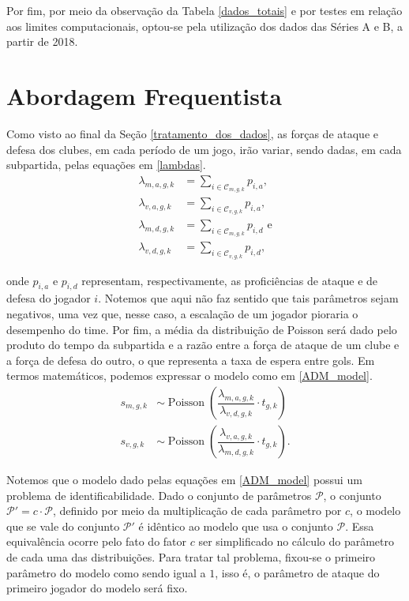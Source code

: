 Por fim, por meio da observação da Tabela \ref{dados_totais} e por testes em relação aos limites computacionais, optou-se pela utilização dos dados das Séries A e B, a partir de 2018.

\section{Abordagem Frequentista}
\label{abordagem_frequentista}

Como visto ao final da Seção \ref{tratamento_dos_dados}, as forças de ataque e defesa dos clubes, em cada período de um jogo, irão variar, sendo dadas, em cada subpartida, pelas equações em \ref{lambdas}.
\begin{equation}
    \begin{split}
        \lambda_{m, a, g, k} & = \sum_{i \in \mathcal{C}_{m, g, k}} p_{i, a}, \\
        \lambda_{v, a, g, k} & = \sum_{i \in \mathcal{C}_{v, g, k}} p_{i, a}, \\
        \lambda_{m, d, g, k} & = \sum_{i \in \mathcal{C}_{m, g, k}} p_{i, d} \text{ e} \\
        \lambda_{v, d, g, k} & = \sum_{i \in \mathcal{C}_{v, g, k}} p_{i, d},
    \end{split}
    \label{lambdas}
\end{equation}

\noindent onde $p_{i, a}$ e $p_{i, d}$ representam, respectivamente, as proficiências de ataque e de defesa do jogador $i$. Notemos que aqui não faz sentido que tais parâmetros sejam negativos, uma vez que, nesse caso, a escalação de um jogador pioraria o desempenho do time. Por fim, a média da distribuição de Poisson será dado pelo produto do tempo da subpartida e a razão entre a força de ataque de um clube e a força de defesa do outro, o que representa a taxa de espera entre gols. Em termos matemáticos, podemos expressar o modelo como em \ref{ADM_model}.
\begin{equation}
    \begin{split}
    s_{m, g, k} & \sim \operatorname{Poisson}\left(\dfrac{\lambda_{m,a,g,k}}{\lambda_{v,d,g,k}} \cdot t_{g,k}\right) \\
    s_{v, g, k} & \sim \operatorname{Poisson}\left(\dfrac{\lambda_{v,a,g,k}}{\lambda_{m,d,g,k}} \cdot t_{g,k}\right).
    \end{split}
    \label{ADM_model}
\end{equation}

Notemos que o modelo dado pelas equações em \ref{ADM_model} possui um problema de identificabilidade. Dado o conjunto de parâmetros $\mathcal{P}$, o conjunto $\mathcal{P}' = c\cdot \mathcal{P}$, definido por meio da multiplicação de cada parâmetro por $c$, o modelo que se vale do conjunto $\mathcal{P}'$ é idêntico ao modelo que usa o conjunto $\mathcal{P}$. Essa equivalência ocorre pelo fato do fator $c$ ser simplificado no cálculo do parâmetro de cada uma das distribuições. Para tratar tal problema, fixou-se o primeiro parâmetro do modelo como sendo igual a $1$, isso é, o parâmetro de ataque do primeiro jogador do modelo será fixo.

